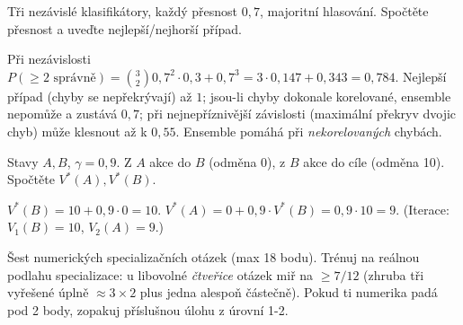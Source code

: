 \begin{zadani}Tři nezávislé klasifikátory, každý přesnost $0{,}7$, majoritní hlasování. Spočtěte přesnost a uveďte nejlepší/nejhorší případ.\end{zadani}
\begin{reseni}Při nezávislosti $P(\ge2\text{ správně})=\binom32 0{,}7^2\cdot0{,}3+0{,}7^3=3\cdot0{,}147+0{,}343=0{,}784$. Nejlepší případ (chyby se nepřekrývají) až $1$; jsou-li chyby dokonale korelované, ensemble nepomůže a zustává $0{,}7$; při nejnepříznivější závislosti (maximální překryv dvojic chyb) může klesnout až k $0{,}55$. Ensemble pomáhá při \emph{nekorelovaných} chybách.\end{reseni}

\begin{zadani}Stavy $A,B$, $\gamma=0{,}9$. Z $A$ akce do $B$ (odměna 0), z $B$ akce do cíle (odměna 10). Spočtěte $V^*(A),V^*(B)$.\end{zadani}
\begin{reseni}$V^*(B)=10+0{,}9\cdot0=10$. $V^*(A)=0+0{,}9\cdot V^*(B)=0{,}9\cdot10=9$. (Iterace: $V_1(B)=10$, $V_2(A)=9$.)\end{reseni}

\begin{infobox}[title={Vyhodnocení}]
\footnotesize Šest numerických specializačních otázek (max 18 bodu). Trénuj na reálnou podlahu specializace: u libovolné \emph{čtveřice} otázek miř na $\ge7/12$ (zhruba tři vyřešené úplně $\approx3{\times}2$ plus jedna alespoň částečně). Pokud ti numerika padá pod 2 body, zopakuj příslušnou úlohu z úrovní 1-2.
\end{infobox}
